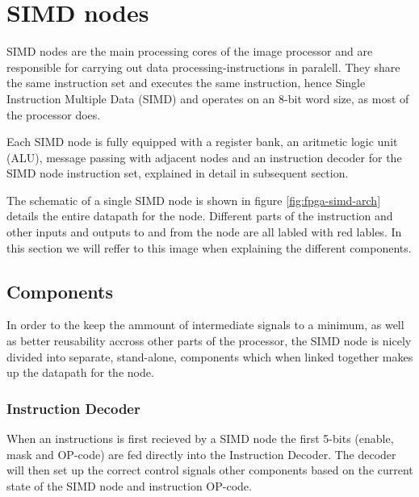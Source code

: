 \section{SIMD nodes}

SIMD nodes are the main processing cores of the image processor and are responsible for carrying out data processing-instructions in paralell. They share the same instruction set and executes the same instruction, hence Single Instruction Multiple Data (SIMD) and operates on an 8-bit word size, as most of the processor does.

Each SIMD node is fully equipped with a register bank, an aritmetic logic unit (ALU), message passing with adjacent nodes and an instruction decoder for the SIMD node instruction set, explained in detail in subsequent section.

The schematic of a single SIMD node is shown in figure \ref{fig:fpga-simd-arch} details the entire datapath for the node. Different parts of the instruction and other inputs and outputs to and from the node are all labled with red lables. In this section we will reffer to this image when explaining the different components.




\subsection{Components}


In order to the keep the ammount of intermediate signals to a minimum, as well as better reusability accross other parts of the processor, the SIMD node is nicely divided into separate, stand-alone, components which when linked together makes up the datapath for the node.

\subsubsection{Instruction Decoder}


When an instructions is first recieved by a SIMD node the first 5-bits (enable, mask and OP-code) are fed directly into the Instruction Decoder. The decoder will then set up the correct control signals other components based on the current state of the SIMD node and instruction OP-code.

